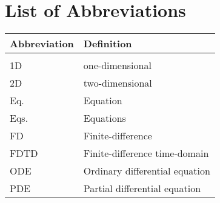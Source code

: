\chapter{List of Abbreviations}
{\centering\renewcommand{\arraystretch}{1.1}
\begin{longtable}{ p{3cm} p{8cm}}
 Abbreviation & Definition\\
 \hline\\
 \endhead
 1D & one-dimensional\\
 2D & two-dimensional \\
 Eq. & Equation \\
 Eqs. & Equations\\
 FD & Finite-difference\\
 FDTD & Finite-difference time-domain\\
 ODE & Ordinary differential equation\\
 PDE & Partial differential equation
\end{longtable}}